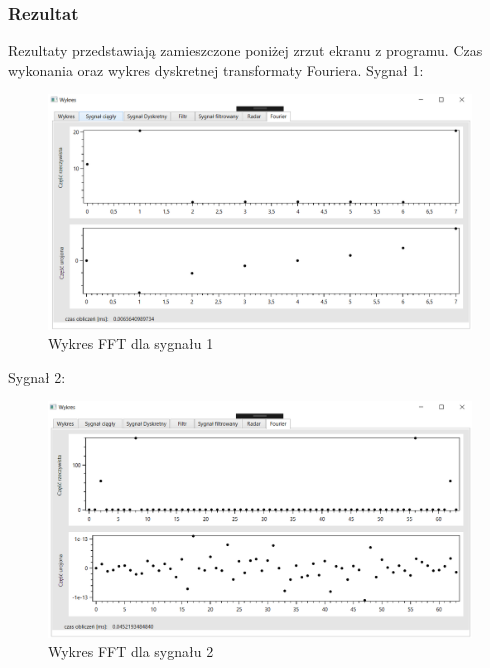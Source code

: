 \documentclass[12pt]{article}
\begin{document}
\subsubsection{Rezultat}

Rezultaty przedstawiają zamieszczone poniżej zrzut ekranu z programu. Czas wykonania oraz wykres dyskretnej transformaty Fouriera.
\newpage
 Sygnał 1:
\begin{figure}[h!]
 \centering
 \includegraphics[width=12.3cm]{s13FFT.PNG}
 \vspace{-0.3cm}
 \caption{Wykres FFT dla sygnału 1}
 \label{Wykres dla wynikw eksperymentu pierwszego}
\end{figure}

Sygnał 2:
\begin{figure}[h!]
 \centering
 \includegraphics[width=12.3cm]{s16FFT.PNG}
 \vspace{-0.3cm}
 \caption{Wykres FFT dla sygnału 2}
 \label{Wykres dla wynikw eksperymentu pierwszego}
\end{figure}
\end{document}
